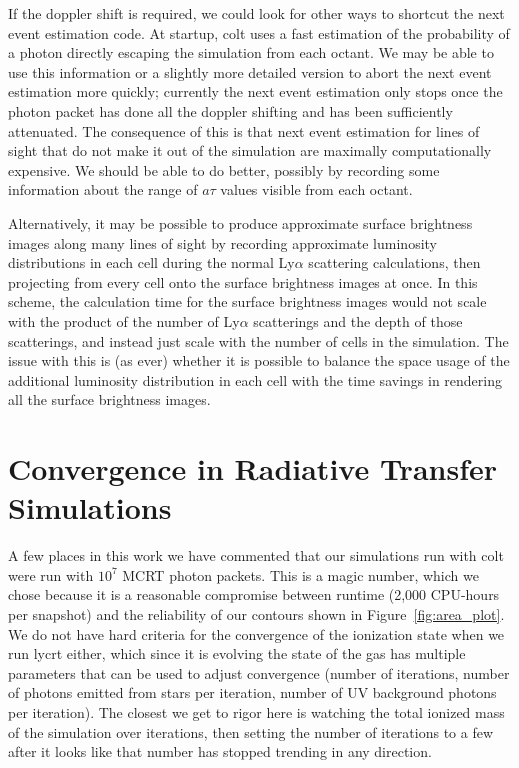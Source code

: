 If the doppler shift is required, we could look for other ways to shortcut the next event estimation code.
At startup, {\sc colt} uses a fast estimation of the probability of a photon directly escaping the simulation from each octant.
We may be able to use this information or a slightly more detailed version to abort the next event estimation more quickly; currently the next event estimation only stops once the photon packet has done all the doppler shifting and has been sufficiently attenuated.
The consequence of this is that next event estimation for lines of sight that do not make it out of the simulation are maximally computationally expensive.
We should be able to do better, possibly by recording some information about the range of $a\tau$ values visible from each octant.

Alternatively, it may be possible to produce approximate surface brightness images along many lines of sight by recording approximate luminosity distributions in each cell during the normal Ly$\alpha$ scattering calculations, then projecting from every cell onto the surface brightness images at once.
In this scheme, the calculation time for the surface brightness images would not scale with the product of the number of Ly$\alpha$ scatterings and the depth of those scatterings, and instead just scale with the number of cells in the simulation.
The issue with this is (as ever) whether it is possible to balance the space usage of the additional luminosity distribution in each cell with the time savings in rendering all the surface brightness images.


\section{Convergence in Radiative Transfer Simulations}
A few places in this work we have commented that our simulations run with {\sc colt} were run with $10^{7}$ MCRT photon packets.
This is a magic number, which we chose because it is a reasonable compromise between runtime (2,000 CPU-hours per snapshot) and the reliability of our contours shown in Figure~\ref{fig:area_plot}.
We do not have hard criteria for the convergence of the ionization state when we run {\sc lycrt} either, which since it is evolving the state of the gas has multiple parameters that can be used to adjust convergence (number of iterations, number of photons emitted from stars per iteration, number of UV background photons per iteration).
The closest we get to rigor here is watching the total ionized mass of the simulation over iterations, then setting the number of iterations to a few after it looks like that number has stopped trending in any direction.

